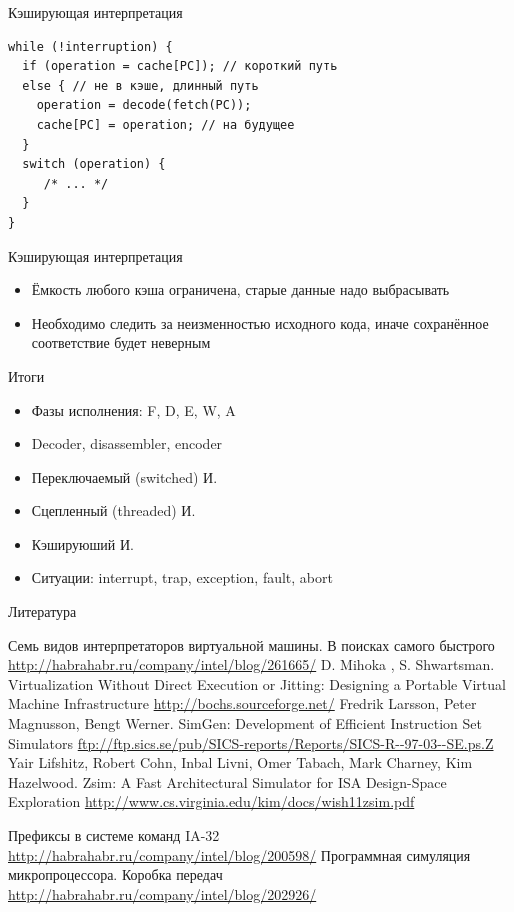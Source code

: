 \documentclass{beamer}
\begin{document}
\begin{frame}[fragile]{Кэширующая интерпретация}
\begin{verbatim}
while (!interruption) {
  if (operation = cache[PC]); // короткий путь
  else { // не в кэше, длинный путь
  	operation = decode(fetch(PC));
  	cache[PC] = operation; // на будущее
  }
  switch (operation) {
     /* ... */
  }
}
\end{verbatim}


\end{frame}

\begin{frame}{Кэширующая интерпретация}
\begin{itemize}
\item Ёмкость любого кэша ограничена, старые данные надо выбрасывать
\item Необходимо следить за неизменностью исходного кода, иначе сохранённое соответствие будет неверным
\end{itemize}
\end{frame}

\begin{frame}{Итоги}
\begin{itemize}
\item Фазы исполнения: F, D, E, W, A
\item Decoder, disassembler, encoder
\item Переключаемый (switched) И.
\item Сцепленный (threaded) И.
\item Кэшируюший И.
\item Ситуации: interrupt, trap, exception, fault, abort
\end{itemize}
\end{frame}

\begin{frame}[allowframebreaks]{Литература}
\begin{thebibliography}{99}
     Семь видов интерпретаторов виртуальной машины. В поисках самого быстрого \url{http://habrahabr.ru/company/intel/blog/261665/}
     D. Mihoka , S. Shwartsman. Virtualization Without Direct Execution or Jitting: Designing a Portable Virtual Machine Infrastructure \url{http://bochs.sourceforge.net/}
     Fredrik Larsson, Peter Magnusson, Bengt Werner. SimGen: Development of Efficient Instruction Set Simulators
\url{ftp://ftp.sics.se/pub/SICS-reports/Reports/SICS-R--97-03--SE.ps.Z}
     Yair Lifshitz, Robert Cohn, Inbal Livni, Omer Tabach, Mark Charney, Kim Hazelwood. Zsim: A Fast Architectural Simulator for ISA Design-Space Exploration \url{http://www.cs.virginia.edu/kim/docs/wish11zsim.pdf}
    
     Префиксы в системе команд IA-32 \url{http://habrahabr.ru/company/intel/blog/200598/}
     Программная симуляция микропроцессора. Коробка передач \url{http://habrahabr.ru/company/intel/blog/202926/}

\end{thebibliography}
\end{frame}
\end{document}
